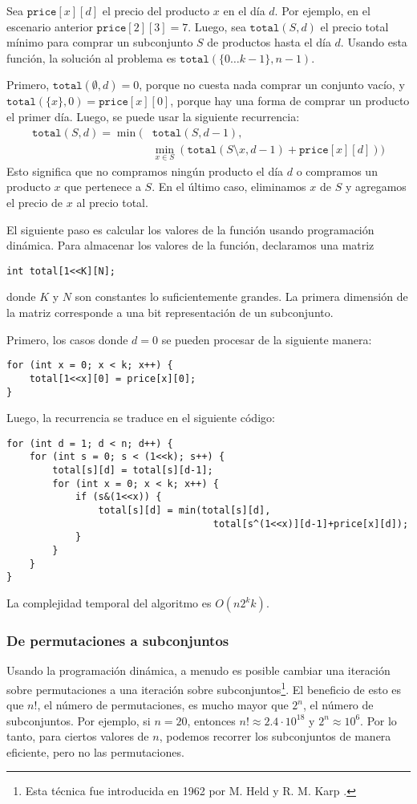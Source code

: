 Sea $\texttt{price}[x][d]$ el precio del producto $x$
en el día $d$.
Por ejemplo, en el escenario anterior $\texttt{price}[2][3] = 7$.
Luego, sea $\texttt{total}(S,d)$ el precio total mínimo
para comprar un subconjunto $S$ de productos hasta el día $d$.
Usando esta función, la solución al problema es
$\texttt{total}(\{0 \ldots k-1\},n-1)$.

Primero, $\texttt{total}(\emptyset,d) = 0$,
porque no cuesta nada comprar un conjunto vacío,
y $\texttt{total}(\{x\},0) = \texttt{price}[x][0]$,
porque hay una forma de comprar un producto el primer día.
Luego, se puede usar la siguiente recurrencia:
\begin{equation*}
\begin{split}
\texttt{total}(S,d) = \min( & \texttt{total}(S,d-1), \\
& \min_{x \in S} (\texttt{total}(S \setminus x,d-1)+\texttt{price}[x][d]))
\end{split}
\end{equation*}
Esto significa que no compramos ningún producto el día $d$
o compramos un producto $x$ que pertenece a $S$.
En el último caso, eliminamos $x$ de $S$ y agregamos el
precio de $x$ al precio total.

El siguiente paso es calcular los valores de la función
usando programación dinámica.
Para almacenar los valores de la función, declaramos una matriz
\begin{lstlisting}
int total[1<<K][N];
\end{lstlisting}
donde $K$ y $N$ son constantes lo suficientemente grandes.
La primera dimensión de la matriz corresponde a una bit
representación de un subconjunto.

Primero, los casos donde $d=0$ se pueden procesar de la siguiente manera:
\begin{lstlisting}
for (int x = 0; x < k; x++) {
    total[1<<x][0] = price[x][0];
}
\end{lstlisting}
Luego, la recurrencia se traduce en el siguiente código:
\begin{lstlisting}
for (int d = 1; d < n; d++) {
    for (int s = 0; s < (1<<k); s++) {
        total[s][d] = total[s][d-1];
        for (int x = 0; x < k; x++) {
            if (s&(1<<x)) {
                total[s][d] = min(total[s][d],
                                    total[s^(1<<x)][d-1]+price[x][d]);
            }
        }
    }
}
\end{lstlisting}
La complejidad temporal del algoritmo es $O(n 2^k k)$.

\subsubsection{De permutaciones a subconjuntos}
Usando la programación dinámica, a menudo es posible
cambiar una iteración sobre permutaciones a
una iteración sobre subconjuntos\footnote{Esta técnica fue introducida en 1962
por M. Held y R. M. Karp \cite{hel62}.}.
El beneficio de esto es que
$n!$, el número de permutaciones,
es mucho mayor que $2^n$, el número de subconjuntos.
Por ejemplo, si $n=20$, entonces
$n! \approx 2.4 \cdot 10^{18}$ y $2^n \approx 10^6$.
Por lo tanto, para ciertos valores de $n$,
podemos recorrer los subconjuntos de manera eficiente, pero no las permutaciones.

